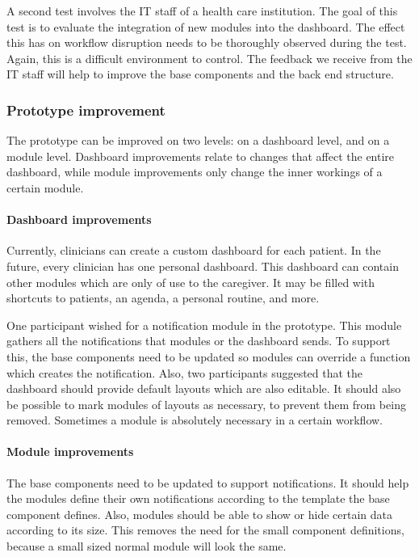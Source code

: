     A second test involves the IT staff of a health care institution. The goal of this test is to evaluate the integration of new modules into the dashboard. The effect this has on workflow disruption needs to be thoroughly observed during the test. Again, this is a difficult environment to control. The feedback we receive from the IT staff will help to improve the base components and the back end structure.
    
    \subsubsection{Prototype improvement}

    The prototype can be improved on two levels: on a dashboard level, and on a module level. Dashboard improvements relate to changes that affect the entire dashboard, while module improvements only change the inner workings of a certain module. 
    
    \paragraph{Dashboard improvements} Currently, clinicians can create a custom dashboard for each patient. In the future, every clinician has one personal dashboard. This dashboard can contain other modules which are only of use to the caregiver. It may be filled with shortcuts to patients, an agenda, a personal routine, and more.

    One participant wished for a notification module in the prototype. This module gathers all the notifications that modules or the dashboard sends. To support this, the base components need to be updated so modules can override a function which creates the notification. Also, two participants suggested that the dashboard should provide default layouts which are also editable. It should also be possible to mark modules of layouts as necessary, to prevent them from being removed. Sometimes a module is absolutely necessary in a certain workflow.

    \paragraph{Module improvements} The base components need to be updated to support notifications. It should help the modules define their own notifications according to the template the base component defines. Also, modules should be able to show or hide certain data according to its size. This removes the need for the small component definitions, because a small sized normal module will look the same.

